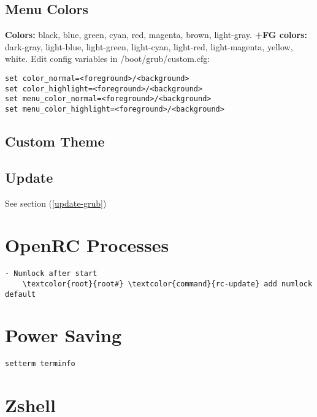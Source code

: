 \documentclass[10pt, a4paper, onecolumn, openany]{book}         %
\begin{document}
\subsection{Menu Colors}
\textbf{Colors:} black, blue, green, cyan, red, magenta, brown, light-gray.\newline
\textbf{+FG colors:} dark-gray, light-blue, light-green, light-cyan, light-red, light-magenta, yellow, white.\newline
Edit config variables in \textcolor{file}{/boot/grub/custom.cfg}:
\begin{Verbatim}[commandchars=\\\{\}]
set color_normal=<foreground>/<background>
set color_highlight=<foreground>/<background>
set menu_color_normal=<foreground>/<background>
set menu_color_highlight=<foreground>/<background>
\end{Verbatim}

\subsection{Custom Theme}

\subsection{Update}
See section (\underline{\ref{update-grub}})

\section{OpenRC Processes}
\begin{Verbatim}[commandchars=\\\{\}]
- Numlock after start
    \textcolor{root}{root#} \textcolor{command}{rc-update} add numlock default
\end{Verbatim}


\section{Power Saving}
\begin{Verbatim}[commandchars=\\\{\}]
setterm terminfo
\end{Verbatim}


\section{Zshell}
\end{document}
